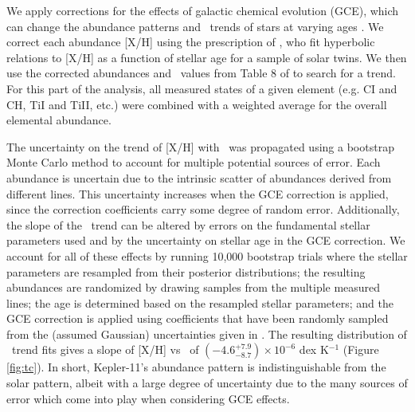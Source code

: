 \documentclass[oneside]{emulateapj}
\begin{document}
We apply corrections for the effects of galactic chemical evolution (GCE), which can change the abundance patterns and \tc\ trends of stars at varying ages \citep{Nissen2015, Spina2016}. We correct each abundance [X/H] using the prescription of \citet{Spina2016b}, who fit hyperbolic relations to [X/H] as a function of stellar age for a sample of solar twins. We then use the corrected abundances and \tc\ values from Table 8 of \citet{Lodders2003} to search for a trend. For this part of the analysis, all measured states of a given element (e.g. CI and CH, TiI and TiII, etc.) were combined with a weighted average for the overall elemental abundance. %

The uncertainty on the trend of [X/H] with \tc\ was propagated using a bootstrap Monte Carlo method to account for multiple potential sources of error. Each abundance is uncertain due to the intrinsic scatter of abundances derived from different lines. This uncertainty increases when the GCE correction is applied, since the correction coefficients carry some degree of random error. Additionally, the slope of the \tc\ trend can be altered by errors on the fundamental stellar parameters used \citep[as seen in][]{Teske2015} and by the uncertainty on stellar age in the GCE correction. We account for all of these effects by running 10,000 bootstrap trials where the stellar parameters are resampled from their posterior distributions; the resulting abundances are randomized by drawing samples from the multiple measured lines; the age is determined based on the resampled stellar parameters; and the GCE correction is applied using coefficients that have been randomly sampled from the (assumed Gaussian) uncertainties given in \citet{Spina2016b}. The resulting distribution of \tc\ trend fits gives a slope of [X/H] vs \tc\ of $(-4.6^{+7.9}_{-8.7}) \times 10^{-6}$ dex K$^{-1}$ (Figure  \ref{fig:tc}). In short, Kepler-11's abundance pattern is indistinguishable from the solar pattern, albeit with a large degree of uncertainty due to the many sources of error which come into play when considering GCE effects.
\end{document}
